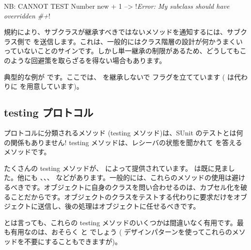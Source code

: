 \documentclass[a4paper,10pt,twoside]{book}
\begin{document}
\begin{code}{NB: CANNOT TEST}
Number new + 1 --> !\emph{Error: My subclass should have overridden \#+}!
\end{code}

規約により、サブクラスが継承すべきではないメソッドを通知するには、サブクラス側で  を送信します。これは、一般的にはクラス階層の設計が何かうまくいっていないことのサインです。しかし単一継承の制限があるため、どうしてもこのような回避策を取らざるを得ない場合もあります。

典型的な例が  です。ここでは、 を継承しないで  フラグを立てています ( は代わりに  を用意しています)。%



\subsection{testing プロトコル}

 プロトコルに分類されるメソッド (testing メソッド)は、SUnit のテストとは何の関係もありません! testing メソッドは、レシーバの状態を聞かれて  を答えるメソッドです。

たくさんの testing メソッドが、 によって提供されています。 は既に見ました。他にも 、、、 などがあります。一般的には、これらのメソッドの使用は避けるべきです。オブジェクトに自身のクラスを問い合わせるのは、カプセル化を破ることだからです。オブジェクトのクラスをテストする代わりに要求だけをオブジェクトに送信し、後の処理はオブジェクトに任せるべきです。%

とは言っても、これらの testing メソッドのいくつかは間違いなく有用です。最も有用なのは、おそらく  と  でしょう (\cite{Wool98a} デザインパターンを使ってこれらのメソッドを不要にすることもできますが)。
\end{document}
